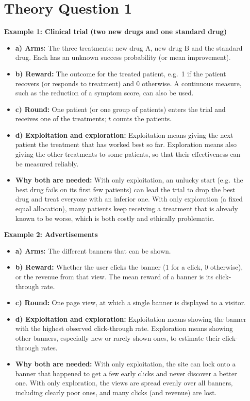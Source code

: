 \documentclass[12pt,a4paper]{article}
\begin{document}
\section*{Theory Question 1} %
\textbf{Example 1: Clinical trial (two new drugs and one standard drug)}
\begin{itemize}
    \item \textbf{a) Arms:} The three treatments: new drug A, new drug B and the standard drug.
Each has an unknown success probability (or mean improvement).
%
    \item \textbf{b) Reward:} The outcome for the treated patient, e.g.\ 1 if the patient recovers (or responds to treatment) and 0 otherwise.
A continuous measure, such as the reduction of a symptom score, can also be used.
%
    \item \textbf{c) Round:} One patient (or one group of patients) enters the trial and receives one of the treatments; $t$ counts the patients.
%
    \item \textbf{d) Exploitation and exploration:} Exploitation means giving the next patient the treatment that has worked best so far.
Exploration means also giving the other treatments to some patients, so that their effectiveness can be measured reliably.
%
    \item \textbf{Why both are needed:} With only exploitation, an unlucky start (e.g.\ the best drug fails on its first few patients) can lead the trial to drop the best drug and treat everyone with an inferior one.
With only exploration (a fixed equal allocation), many patients keep receiving a treatment that is already known to be worse, which is both costly and ethically problematic.
%
\end{itemize}

\textbf{Example 2: Advertisements}
\begin{itemize}
    \item \textbf{a) Arms:} The different banners that can be shown.
%
    \item \textbf{b) Reward:} Whether the user clicks the banner (1 for a click, 0 otherwise), or the revenue from that view.
The mean reward of a banner is its click-through rate.
%
    \item \textbf{c) Round:} One page view, at which a single banner is displayed to a visitor.
%
    \item \textbf{d) Exploitation and exploration:} Exploitation means showing the banner with the highest observed click-through rate.
Exploration means showing other banners, especially new or rarely shown ones, to estimate their click-through rates.
%
    \item \textbf{Why both are needed:} With only exploitation, the site can lock onto a banner that happened to get a few early clicks and never discover a better one.
With only exploration, the views are spread evenly over all banners, including clearly poor ones, and many clicks (and revenue) are lost.
%
\end{itemize}
\end{document}
